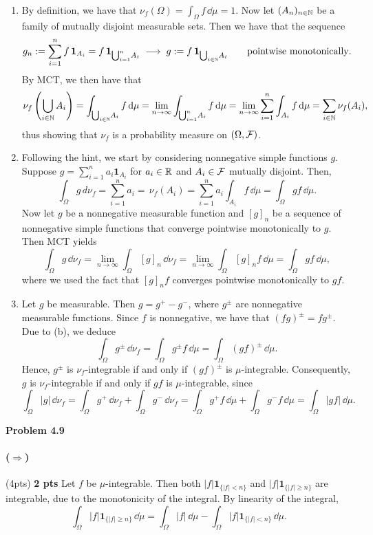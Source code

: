\begin{enumerate}[label={(\alph*)}]
	\item By definition, we have that $\nu_f(\Omega) = \int_\Omega f\,\dd\mu = 1$. Now let $(A_n)_{n\in\mathbb N}$ be a family of mutually disjoint measurable sets. Then we have that the sequence 
	\[
		g_n:= \sum_{i=1}^n f\,\mathbf{1}_{A_i} = f\,\mathbf{1}_{\bigcup_{i=1}^n\! A_i}\;\longrightarrow\; g:= f\,\mathbf{1}_{\bigcup_{i\in\mathbb N}\! A_i}\qquad\text{pointwise monotonically}.
	\]
	By MCT, we then have that
	\[
		\nu_f\left(\bigcup_{i\in\mathbb N} A_i\right) = \int_{\bigcup_{i\in\mathbb N}\! A_i} f\,\mathrm{d}\mu = \lim_{n\to\infty} \int_{\bigcup_{i=1}^n\! A_i} f\,\mathrm{d}\mu = \lim_{n\to\infty} \sum_{i=1}^n \int_{A_i} f\,\mathrm{d}\mu = \sum_{i\in\mathbb N}\nu_f(A_i),
	\]
	thus showing that $\nu_f$ is a probability measure on $(\Omega,\mathcal F)$.
	
	\item Following the hint, we start by considering nonnegative simple functions $g$. Suppose $g=\sum_{i=1}^n a_i \mathbf{1}_{A_i}$ for $a_i\in\mathbb R$ and $A_i\in\mathcal F$ mutually disjoint. Then,
	\[
		\int_\Omega g\,d\nu_f = \sum_{i=1}^n a_i =\,\nu_f(A_i) = \sum_{i=1}^n a_i\int_{A_i} f\,\dd\mu = \int_\Omega gf\,\dd\mu.
	\]
	Now let $g$ be a nonnegative measurable function and $[g]_n$ be a sequence of nonnegative simple functions that converge pointwise monotonically to $g$. Then MCT yields
	\[
		\int_\Omega g\,\dd\nu_f = \lim_{n\to\infty}\int_\Omega [g]_n\,\dd\nu_f = \lim_{n\to\infty} \int_\Omega [g]_n f\,\dd\mu = \int_\Omega gf\,\dd\mu,
	\]
	where we used the fact that $[g]_n f$ converges pointwise monotonically to $gf$.
	
	\item Let $g$ be measurable. Then $g=g^+-g^-$, where $g^\pm$ are nonnegative measurable functions. Since $f$ is nonnegative, we have that $(fg)^\pm = f g^\pm$. Due to (b), we deduce
	\[
		\int_\Omega g^\pm\,\dd\nu_f = \int_\Omega g^\pm f\,\dd\mu = \int_\Omega (gf)^\pm\,\dd\mu.
	\]
	Hence, $g^\pm$ is $\nu_f$-integrable if and only if $(gf)^\pm$ is $\mu$-integrable. Consequently, $g$ is $\nu_f$-integrable if and only if $gf$ is $\mu$-integrable, since
	\[
		\int_\Omega |g|\,\dd\nu_f = \int_\Omega g^+\,\dd\nu_f + \int_\Omega g^-\,\dd\nu_f = \int_\Omega g^+f\,\dd\mu + \int_\Omega g^-f\,\dd\mu = \int_\Omega |gf|\,\dd\mu.
	\]
\end{enumerate}

\bigskip
\textbf{Problem 4.9}

\paragraph{($\Rightarrow$)} (4pts) 
\textbf{2 pts}
Let $f$ be $\mu$-integrable. Then both $|f|\mathbf{1}_{\{|f|<n\}}$ and $|f|\mathbf{1}_{\{|f|\ge n\}}$ are integrable, due to the monotonicity of the integral. By linearity of the integral,
\[
	\int_\Omega |f|\mathbf{1}_{\{|f|\ge n\}}\,\dd\mu = \int_\Omega |f|\,\dd\mu - \int_\Omega |f|\mathbf{1}_{\{|f|< n\}}\,\dd\mu.
\]

